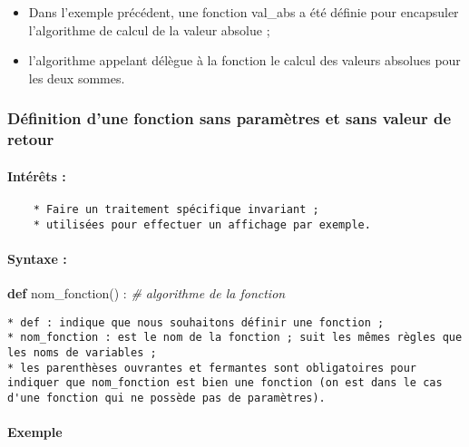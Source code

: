 \documentclass[11pt]{article}
\providecommand{\tightlist}{%
      \setlength{\itemsep}{0pt}\setlength{\parskip}{0pt}}
\newenvironment{Shaded}{}{}
\newcommand{\KeywordTok}[1]{\textcolor[rgb]{0.00,0.44,0.13}{\textbf{{#1}}}}
\newcommand{\CommentTok}[1]{\textcolor[rgb]{0.38,0.63,0.69}{\textit{{#1}}}}
\newcommand{\NormalTok}[1]{{#1}}
\begin{document}
    \begin{itemize}
\tightlist
\item
  Dans l'exemple précédent, une fonction val\_abs a été définie pour
  encapsuler l'algorithme de calcul de la valeur absolue ;
\item
  l'algorithme appelant délègue à la fonction le calcul des valeurs
  absolues pour les deux sommes.
\end{itemize}

    \subsubsection{Définition d'une fonction sans paramètres et sans valeur
de
retour}\label{duxe9finition-dune-fonction-sans-paramuxe8tres-et-sans-valeur-de-retour}

    \paragraph{Intérêts :}\label{intuxe9ruxeats}

\begin{verbatim}
    * Faire un traitement spécifique invariant ;
    * utilisées pour effectuer un affichage par exemple.
\end{verbatim}

    \paragraph{Syntaxe :}\label{syntaxe}

\begin{Shaded}
\begin{Highlighting}[]
    \KeywordTok{def}\NormalTok{ nom_fonction() :}
        \CommentTok{# algorithme de la fonction}
\end{Highlighting}
\end{Shaded}

\begin{verbatim}
* def : indique que nous souhaitons définir une fonction ;
* nom_fonction : est le nom de la fonction ; suit les mêmes règles que les noms de variables ;
* les parenthèses ouvrantes et fermantes sont obligatoires pour indiquer que nom_fonction est bien une fonction (on est dans le cas d'une fonction qui ne possède pas de paramètres).
\end{verbatim}

    \paragraph{Exemple}\label{exemple}
\end{document}
